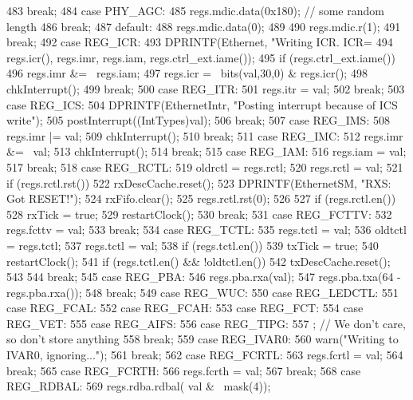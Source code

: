 \begin{DoxyCode}
{{{483             break;
484           case PHY_AGC:
485             regs.mdic.data(0x180); // some random length
486             break;
487           default:
488             regs.mdic.data(0);
489         }
490         regs.mdic.r(1);
491         break;
492       case REG_ICR:
493         DPRINTF(Ethernet, "Writing ICR. ICR=%
494                 regs.icr(), regs.imr, regs.iam, regs.ctrl_ext.iame());
495         if (regs.ctrl_ext.iame())
496             regs.imr &= ~regs.iam;
497         regs.icr = ~bits(val,30,0) & regs.icr();
498         chkInterrupt();
499         break;
500       case REG_ITR:
501         regs.itr = val;
502         break;
503       case REG_ICS:
504         DPRINTF(EthernetIntr, "Posting interrupt because of ICS write\n");
505         postInterrupt((IntTypes)val);
506         break;
507       case REG_IMS:
508         regs.imr |= val;
509         chkInterrupt();
510         break;
511       case REG_IMC:
512         regs.imr &= ~val;
513         chkInterrupt();
514         break;
515       case REG_IAM:
516         regs.iam = val;
517         break;
518       case REG_RCTL:
519         oldrctl = regs.rctl;
520         regs.rctl = val;
521         if (regs.rctl.rst()) {
522             rxDescCache.reset();
523             DPRINTF(EthernetSM, "RXS: Got RESET!\n");
524             rxFifo.clear();
525             regs.rctl.rst(0);
526         }
527         if (regs.rctl.en())
528             rxTick = true;
529         restartClock();
530         break;
531       case REG_FCTTV:
532         regs.fcttv = val;
533         break;
534       case REG_TCTL:
535         regs.tctl = val;
536         oldtctl = regs.tctl;
537         regs.tctl = val;
538         if (regs.tctl.en())
539             txTick = true;
540         restartClock();
541         if (regs.tctl.en() && !oldtctl.en()) {
542             txDescCache.reset();
543         }
544         break;
545       case REG_PBA:
546         regs.pba.rxa(val);
547         regs.pba.txa(64 - regs.pba.rxa());
548         break;
549       case REG_WUC:
550       case REG_LEDCTL:
551       case REG_FCAL:
552       case REG_FCAH:
553       case REG_FCT:
554       case REG_VET:
555       case REG_AIFS:
556       case REG_TIPG:
557         ; // We don't care, so don't store anything
558         break;
559       case REG_IVAR0:
560         warn("Writing to IVAR0, ignoring...\n");
561         break;
562       case REG_FCRTL:
563         regs.fcrtl = val;
564         break;
565       case REG_FCRTH:
566         regs.fcrth = val;
567         break;
568       case REG_RDBAL:
569         regs.rdba.rdbal( val & ~mask(4));
}}
\end{DoxyCode}

